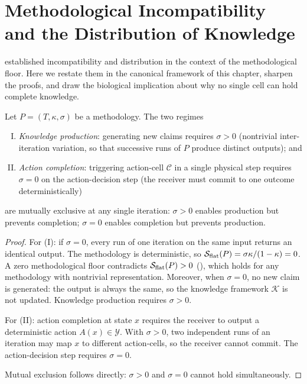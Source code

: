 \section{Methodological Incompatibility and the Distribution of Knowledge}
\label{sec:incompat-ch02}

 established incompatibility
and distribution in the context of the methodological floor.  Here we restate
them in the canonical framework of this chapter, sharpen the proofs, and draw
the biological implication about why no single cell can hold complete knowledge.

\begin{theorem}
\label{thm:incompat-ch02}
Let $P = (T, \kappa, \sigma)$ be a methodology.  The two regimes
\begin{enumerate}[(I)]
  \item \emph{Knowledge production}: generating new claims requires $\sigma > 0$
    (nontrivial inter-iteration variation, so that successive runs of $P$ produce
    distinct outputs); and
  \item \emph{Action completion}: triggering action-cell $\mathcal{C}$ in a
    single physical step requires $\sigma = 0$ on the action-decision step
    (the receiver must commit to one outcome deterministically)
\end{enumerate}
are mutually exclusive at any single iteration: $\sigma > 0$ enables
production but prevents completion; $\sigma = 0$ enables completion but
prevents production.
\end{theorem}

\begin{proof}
For (I): if $\sigma = 0$, every run of one iteration on the same input
returns an identical output.  The methodology is deterministic, so
$\mathcal{S}_{\mathrm{flat}}(P) = \sigma\kappa/(1-\kappa) = 0$.  A zero
methodological floor contradicts $\mathcal{S}_{\mathrm{flat}}(P) > 0$
(), which holds for any methodology with
nontrivial representation.  Moreover, when $\sigma = 0$, no new claim is
generated: the output is always the same, so the knowledge framework
$\mathcal{K}$ is not updated.  Knowledge production requires $\sigma > 0$.

For (II): action completion at state $x$ requires the receiver to output a
deterministic action $A(x) \in \mathcal{Y}$.  With $\sigma > 0$, two
independent runs of an iteration may map $x$ to different action-cells,
so the receiver cannot commit.  The action-decision step requires $\sigma = 0$.

Mutual exclusion follows directly: $\sigma > 0$ and $\sigma = 0$ cannot
hold simultaneously.
\end{proof}

